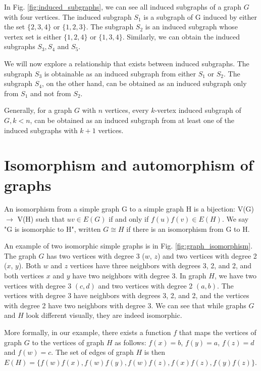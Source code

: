 In Fig. \ref{fig:induced_subgraphs}, we can see all induced subgraphs of a graph $G$ with four vertices. The induced subgraph $S_1$ is a subgraph of G induced by either the set $\{ 2, 3, 4 \}$ or $\{ 1, 2, 3 \}$. The subgraph $S_2$ is an induced subgraph whose vertex set is either $\{ 1, 2, 4\}$ or $\{ 1, 3, 4\}$. Similarly, we can obtain the induced subgraphs $S_3, S_4$ and $S_5$.

We will now explore a relationship that exists between induced subgraphs. The subgraph $S_3$ is obtainable as an induced subgraph from either $S_1$ or $S_2$. The subgraph $S_4$, on the other hand, can be obtained as an induced subgraph only from $S_1$ and not from $S_2$.

Generally, for a graph $G$ with $n$ vertices, every $k$-vertex induced subgraph of $G, k < n$, can be obtained as an induced subgraph from at least one of the induced subgraphs with $k+1$ vertices.

\section{Isomorphism and automorphism of graphs}

\begin{definition}
\label{def:isomorphism}
An isomorphism from a simple graph G to a simple graph H is a bijection: V(G) $\to$ V(H) such that $uv \in E(G)$ if and only if $f(u)f(v) \in E(H)$. We say "G is isomorphic to H", written $G \cong H$ if there is an isomorphism from G to H.
\end{definition}

An example of two isomorphic simple graphs is in Fig. \ref{fig:graph_isomorphism}. The graph $G$ has two vertices with degree 3 ($w$, $z$) and two vertices with degree 2 ($x$, $y$). Both $w$ and $z$ vertices have three neighbors with degrees 3, 2, and 2, and both vertices $x$ and $y$ have two neighbors with degree 3.
In graph $H$, we have two vertices with degree 3 $(c, d)$ and two vertices with degree 2 $(a, b)$. The vertices with degree 3 have neighbors with degrees 3, 2, and 2, and the vertices with degree 2 have two neighbors with degree 3. We can see that while graphs $G$ and $H$ look different visually, they are indeed isomorphic.

More formally, in our example, there exists a function $f$ that maps the vertices of graph $G$ to the vertices of graph $H$ as follows: $f(x) = b$, $f(y) = a$, $f(z) = d$ and $f(w) = c$. The set of edges of graph $H$ is then $E(H) = \{ f(w)f(x), f(w)f(y), f(w)f(z), f(x)f(z), f(y)f(z) \}$.


